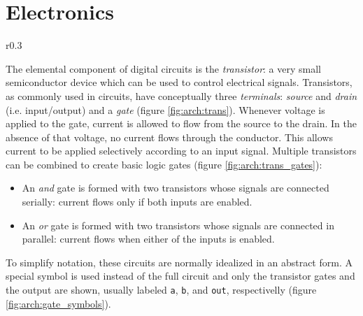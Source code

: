 \section{Electronics}

\begin{wrapfigure}{r}{0.3\textwidth}
    \centering
    
    \caption{Transistor}
    \label{fig:arch:trans}
\end{wrapfigure}

The elemental component of digital circuits is the \textit{transistor}: a very
small semiconductor device which can be used to control electrical signals.
Transistors, as commonly used in circuits, have conceptually three
\textit{terminals}: \textit{source} and \textit{drain} (i.e. input/output) and a
\textit{gate} (figure \ref{fig:arch:trans})\footnotemark.  Whenever voltage is
applied to the gate, current is allowed to flow from the source to the drain.
In the absence of that voltage, no current flows through the conductor.  This
allows current to be applied selectively according to an input signal.  Multiple
transistors can be combined to create basic logic gates (figure
\ref{fig:arch:trans_gates}):


\begin{itemize}
    \item
        An \textit{and} gate is formed with two transistors whose signals are
        connected serially: current flows only if both inputs are enabled.
    \item
        An \textit{or} gate is formed with two transistors whose signals are
        connected in parallel: current flows when either of the inputs is
        enabled.
\end{itemize}

To simplify notation, these circuits are normally idealized in an abstract form.
A special symbol is used instead of the full circuit and only the transistor
gates and the output are shown, usually labeled \texttt{a}, \texttt{b}, and
\texttt{out}, respectivelly (figure \ref{fig:arch:gate_symbols}).

